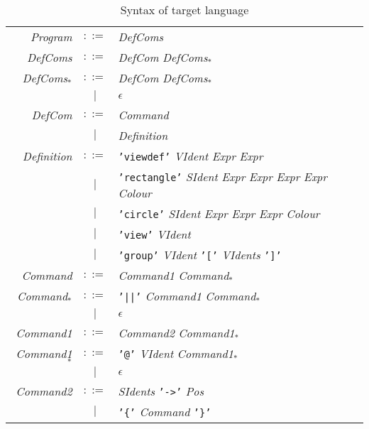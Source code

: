 \documentclass[
paper=a4,
oneside,
fontsize=11pt,
numbers=noenddot,
headinclude=false, %
footinclude=false, %
fleqn,             %
DIV=8
]{scrartcl}
\begin{document}
\begin{table}[h]
  \centering\regnum
  \caption{Syntax of target language}\label{grammar}
  \begin{tabularx}{\textwidth}{rcX} \toprule
    {\em Program}    & $::=$ & {\em DefComs}\\
    {\em DefComs}    & $::=$ & {\em DefCom} {\em DefComs$_{*}$}\\
    {\em DefComs$_{*}$}   & $::=$ & {\em DefCom} {\em DefComs$_{*}$}\\
               & $|$   & $\epsilon$\\
    {\em DefCom}     & $::=$ & {\em Command}\\
               & $|$   & {\em Definition}\\
    {\em Definition} & $::=$ & {\tt 'viewdef'} {\em VIdent} {\em Expr} {\em Expr}\\
               & $|$   & {\tt 'rectangle'} {\em SIdent} {\em Expr} {\em Expr} {\em Expr} {\em Expr} {\em Colour}\\
               & $|$   & {\tt 'circle'} {\em SIdent} {\em Expr} {\em Expr} {\em Expr} {\em Colour}\\
               & $|$   & {\tt 'view'} {\em VIdent}\\
               & $|$   & {\tt 'group'} {\em VIdent} {\tt '['} {\em VIdents} {\tt ']'}\\
    {\em Command}    & $::=$ & {\em Command1} {\em Command$_{*}$}\\
    {\em Command$_{*}$}    & $::=$ & {\tt '||'} {\em Command1} {\em Command$_{*}$}\\
               & $|$ & $\epsilon$ \\
    {\em Command1}    & $::=$ & {\em Command2} {\em Command1$_{*}$}\\
    {\em Command1$_{*}$}    & $::=$ & {\tt '@'} {\em VIdent} {\em Command1$_{*}$}\\
               & $|$ & $\epsilon$ \\
    {\em Command2}    & $::=$ & {\em SIdents} {\tt '->'} {\em Pos}\\
               & $|$   & {\tt '\{'} {\em Command} {\tt '\}'}\\


\end{tabularx}
\end{table}
\end{document}
